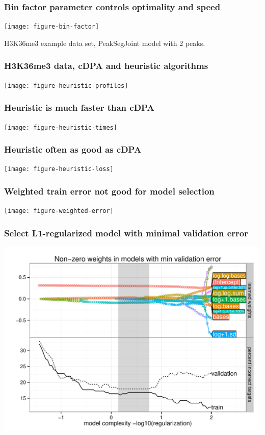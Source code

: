 \documentclass{beamer}
\begin{document}
\begin{frame}
  \frametitle{Bin factor parameter controls optimality and speed}
  \texttt{[image: figure-bin-factor]}

  H3K36me3 example data set, PeakSegJoint model with 2 peaks.
\end{frame}

\begin{frame}
  \frametitle{H3K36me3 data, cDPA and heuristic algorithms}

  \texttt{[image: figure-heuristic-profiles]}
\end{frame}

\begin{frame}
  \frametitle{Heuristic is much faster than cDPA}

  \texttt{[image: figure-heuristic-times]}
\end{frame}

\begin{frame}
  \frametitle{Heuristic often as good as cDPA}

  \texttt{[image: figure-heuristic-loss]}
\end{frame}


\begin{frame}
  \frametitle{Weighted train error not good for model selection}

  \texttt{[image: figure-weighted-error]}
\end{frame}

\begin{frame}
  \frametitle{Select L1-regularized model with minimal validation error}

  \includegraphics[height=0.9\textheight]{figure-lasso-path}
\end{frame}
\end{document}
